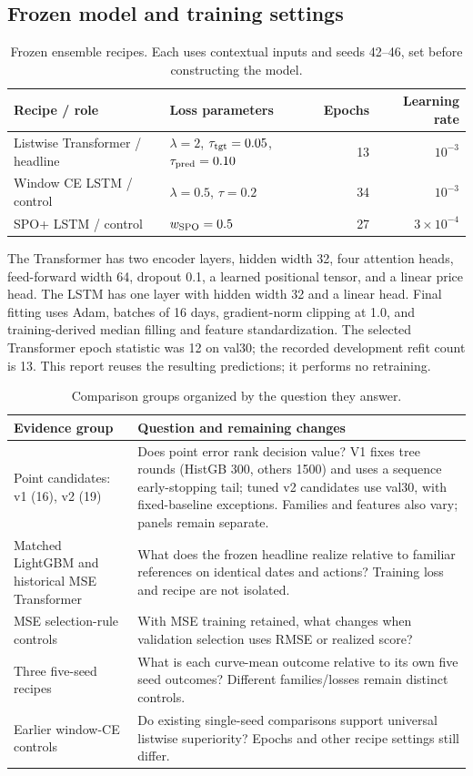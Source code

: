 \documentclass[11pt,a4paper]{article}
\begin{document}
\subsection{Frozen model and training settings}
\begin{table}[!htbp]\centering\small
\caption{Frozen ensemble recipes. Each uses contextual inputs and seeds 42--46, set before constructing the model.}\label{tab:config}
\begin{tabularx}{\linewidth}{@{}p{.26\linewidth}Xrr@{}}\toprule
Recipe / role & Loss parameters & Epochs & Learning rate \\\midrule
Listwise Transformer / headline & $\lambda=2$, $\tau_{\rm tgt}=0.05$, $\tau_{\rm pred}=0.10$ & 13 & $10^{-3}$ \\
Window CE LSTM / control & $\lambda=0.5$, $\tau=0.2$ & 34 & $10^{-3}$ \\
SPO+ LSTM / control & $w_{\rm SPO}=0.5$ & 27 & $3\times10^{-4}$ \\\bottomrule
\end{tabularx}\end{table}
The Transformer has two encoder layers, hidden width 32, four attention heads, feed-forward width 64, dropout 0.1, a learned positional tensor, and a linear price head. The LSTM has one layer with hidden width 32 and a linear head. Final fitting uses Adam, batches of 16 days, gradient-norm clipping at 1.0, and training-derived median filling and feature standardization. The selected Transformer epoch statistic was 12 on val30; the recorded development refit count is 13. This report reuses the resulting predictions; it performs no retraining.

\begin{table}[!htbp]\centering\small
\caption{Comparison groups organized by the question they answer.}\label{tab:groups}
\begin{tabularx}{\linewidth}{@{}p{.27\linewidth}X@{}}\toprule
Evidence group & Question and remaining changes \\\midrule
Point candidates: v1 (16), v2 (19) & Does point error rank decision value? V1 fixes tree rounds (HistGB 300, others 1500) and uses a sequence early-stopping tail; tuned v2 candidates use val30, with fixed-baseline exceptions. Families and features also vary; panels remain separate. \\
Matched LightGBM and historical MSE Transformer & What does the frozen headline realize relative to familiar references on identical dates and actions? Training loss and recipe are not isolated. \\
MSE selection-rule controls & With MSE training retained, what changes when validation selection uses RMSE or realized score? \\
Three five-seed recipes & What is each curve-mean outcome relative to its own five seed outcomes? Different families/losses remain distinct controls. \\
Earlier window-CE controls & Do existing single-seed comparisons support universal listwise superiority? Epochs and other recipe settings still differ. \\\bottomrule
\end{tabularx}\end{table}
\end{document}
